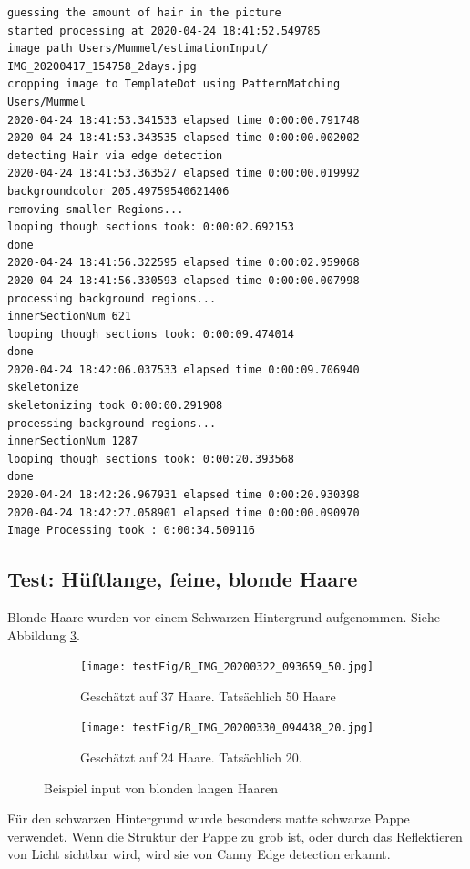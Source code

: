 \documentclass[german,a4paper, 12pt]{llncs}
\begin{document}
\begin{lstlisting}[style=DOS]
guessing the amount of hair in the picture
started processing at 2020-04-24 18:41:52.549785
image path Users/Mummel/estimationInput/
IMG_20200417_154758_2days.jpg
cropping image to TemplateDot using PatternMatching
Users/Mummel
2020-04-24 18:41:53.341533 elapsed time 0:00:00.791748
2020-04-24 18:41:53.343535 elapsed time 0:00:00.002002
detecting Hair via edge detection
2020-04-24 18:41:53.363527 elapsed time 0:00:00.019992
backgroundcolor 205.49759540621406
removing smaller Regions...
looping though sections took: 0:00:02.692153
done
2020-04-24 18:41:56.322595 elapsed time 0:00:02.959068
2020-04-24 18:41:56.330593 elapsed time 0:00:00.007998
processing background regions...
innerSectionNum 621
looping though sections took: 0:00:09.474014
done
2020-04-24 18:42:06.037533 elapsed time 0:00:09.706940
skeletonize
skeletonizing took 0:00:00.291908
processing background regions...
innerSectionNum 1287
looping though sections took: 0:00:20.393568
done
2020-04-24 18:42:26.967931 elapsed time 0:00:20.930398
2020-04-24 18:42:27.058901 elapsed time 0:00:00.090970
Image Processing took : 0:00:34.509116
\end{lstlisting}

\subsection{Test: Hüftlange, feine, blonde Haare}

Blonde Haare wurden vor einem Schwarzen Hintergrund aufgenommen. Siehe Abbildung \ref{img:tstB}.

\begin{figure}
	\centering
	\begin{subfigure}[b]{0.475\textwidth}
		\centering
		\texttt{[image: testFig/B\_IMG\_20200322\_093659\_50.jpg]}
		\caption[]{Geschätzt auf 37 Haare. Tatsächlich 50 Haare}
		\label{img:tstB1} 
	\end{subfigure}
	\hfill
	\begin{subfigure}[b]{0.475\textwidth} 
		\centering
		\texttt{[image: testFig/B\_IMG\_20200330\_094438\_20.jpg]}
		\caption[]{Geschätzt auf 24 Haare. Tatsächlich 20.}
		\label{img:tstB2}
	\end{subfigure}
	\caption[  ]
	{\small Beispiel input von blonden langen Haaren} 
	\label{img:tstB}
\end{figure}
Für den schwarzen Hintergrund wurde besonders matte schwarze Pappe verwendet. Wenn die Struktur der Pappe zu grob ist, oder durch das Reflektieren von Licht sichtbar wird, wird sie von Canny Edge detection erkannt.
 
\end{document}
